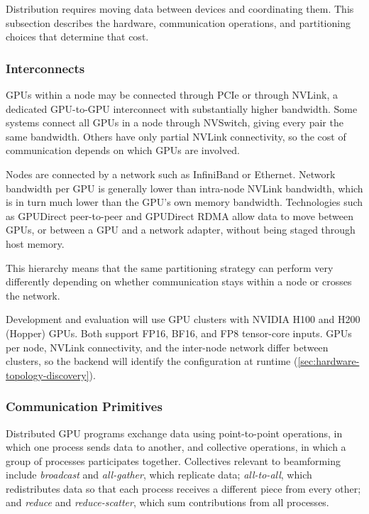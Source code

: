 Distribution requires moving data between devices and coordinating them. This subsection describes the hardware, communication operations, and partitioning choices that determine that cost.

\subsubsection{Interconnects}
\label{sec:interconnects}

GPUs within a node may be connected through PCIe or through NVLink, a dedicated GPU-to-GPU interconnect with substantially higher bandwidth. Some systems connect all GPUs in a node through NVSwitch, giving every pair the same bandwidth. Others have only partial NVLink connectivity, so the cost of communication depends on which GPUs are involved.

Nodes are connected by a network such as InfiniBand or Ethernet. Network bandwidth per GPU is generally lower than intra-node NVLink bandwidth, which is in turn much lower than the GPU's own memory bandwidth. Technologies such as GPUDirect peer-to-peer and GPUDirect RDMA allow data to move between GPUs, or between a GPU and a network adapter, without being staged through host memory.

This hierarchy means that the same partitioning strategy can perform very differently depending on whether communication stays within a node or crosses the network.

Development and evaluation will use GPU clusters with NVIDIA H100 and H200 (Hopper) GPUs. Both support FP16, BF16, and FP8 tensor-core inputs. GPUs per node, NVLink connectivity, and the inter-node network differ between clusters, so the backend will identify the configuration at runtime (\cref{sec:hardware-topology-discovery}).

\subsubsection{Communication Primitives}
\label{sec:communication-primitives}

Distributed GPU programs exchange data using point-to-point operations, in which one process sends data to another, and collective operations, in which a group of processes participates together. Collectives relevant to beamforming include \emph{broadcast} and \emph{all-gather}, which replicate data; \emph{all-to-all}, which redistributes data so that each process receives a different piece from every other; and \emph{reduce} and \emph{reduce-scatter}, which sum contributions from all processes.

